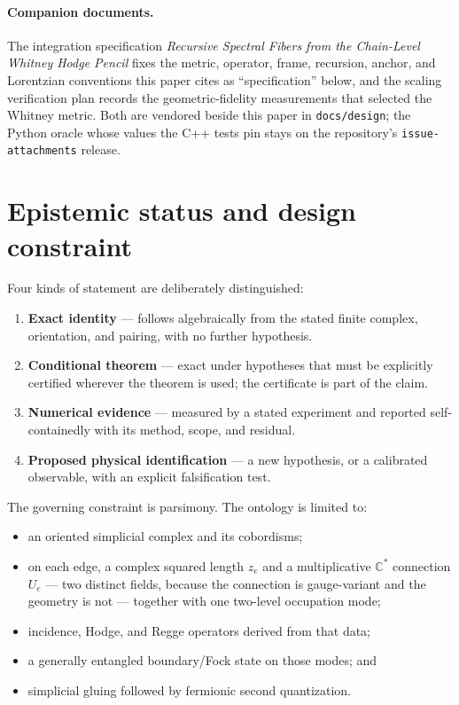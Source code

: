 \documentclass[11pt,letterpaper]{article}
\begin{document}
\hypersetup{pageanchor=true}
\begingroup
\small
\tableofcontents
\endgroup
\clearpage
{}

\paragraph*{Companion documents.}
The integration specification \emph{Recursive Spectral Fibers from the
Chain-Level Whitney Hodge Pencil} \cite{whitneyspec} fixes the metric,
operator, frame, recursion, anchor, and Lorentzian conventions this paper
cites as ``specification'' below, and the scaling verification plan
\cite{svp} records the geometric-fidelity measurements that selected the
Whitney metric. Both are vendored beside this paper in \texttt{docs/design};
the Python oracle whose values the C++ tests pin stays on the repository's
\texttt{issue-attachments} release.

\section{Epistemic status and design constraint}\label{sec:epistemic}

Four kinds of statement are deliberately distinguished:
\begin{enumerate}
  \item \textbf{Exact identity} --- follows algebraically from the stated
    finite complex, orientation, and pairing, with no further hypothesis.
  \item \textbf{Conditional theorem} --- exact under hypotheses that must be
    explicitly certified wherever the theorem is used; the certificate is part
    of the claim.
  \item \textbf{Numerical evidence} --- measured by a stated experiment and
    reported self-containedly with its method, scope, and residual.
  \item \textbf{Proposed physical identification} --- a new hypothesis, or a
    calibrated observable, with an explicit falsification test.
\end{enumerate}

The governing constraint is parsimony. The ontology is limited to:
\begin{itemize}
  \item an oriented simplicial complex and its cobordisms;
  \item on each edge, a complex squared length $z_e$ and a multiplicative
    $\mathbb{C}^{*}$ connection $U_e$ --- two distinct fields, because the
    connection is gauge-variant and the geometry is not --- together with one
    two-level occupation mode;
  \item incidence, Hodge, and Regge operators derived from that data;
  \item a generally entangled boundary/Fock state on those modes; and
  \item simplicial gluing followed by fermionic second quantization.
\end{itemize}
\end{document}
